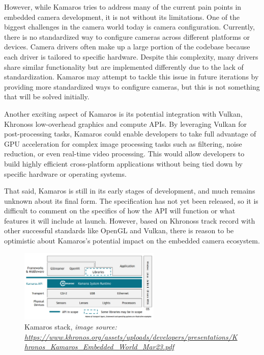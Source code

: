 However, while Kamaros tries to address many of the current pain points in
embedded camera development, it is not without its limitations. One of the
biggest challenges in the camera world today is camera configuration.
Currently, there is no standardized way to configure cameras across different
platforms or devices. Camera drivers often make up a large portion of the
codebase because each driver is tailored to specific hardware. Despite this
complexity, many drivers share similar functionality but are implemented
differently due to the lack of standardization. Kamaros may attempt to tackle
this issue in future iterations by providing more standardized ways to
configure cameras, but this is not something that will be solved initially.

Another exciting aspect of Kamaros is its potential integration with Vulkan,
Khronoss low-overhead graphics and compute APIs. By leveraging Vulkan for
post-processing tasks, Kamaros could enable developers to take full advantage
of GPU acceleration for complex image processing tasks such as filtering,
noise reduction, or even real-time video processing. This would allow
developers to build highly efficient cross-platform applications without being
tied down by specific hardware or operating systems.

That said, Kamaros is still in its early stages of development, and much
remains unknown about its final form. The specification has not yet been
released, so it is difficult to comment on the specifics of how the API will
function or what features it will include at launch. However, based on
Khronoss track record with other successful standards like OpenGL and Vulkan,
there is reason to be optimistic about Kamaros's potential impact on the
embedded camera ecosystem.

\begin{figure}
    \begin{center}
        \includegraphics[width=0.60\textwidth]{figures/kamaros_stack.png}
    \end{center}
    \caption[Kamaros stack]{Kamaros stack, \textit{image source: \url{https://www.khronos.org/assets/uploads/developers/presentations/Khronos\_Kamaros\_Embedded\_World\_Mar23.pdf}}}\label{fig:kamaros_stack}
\end{figure}

